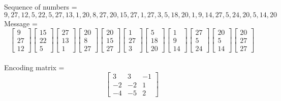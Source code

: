 \documentclass{article}
\begin{document}
\noindent
Sequence of numbers = 
$$
9, 27, 12, 5, 22, 5, 27, 13, 1, 20, 8, 27, 20, 15, 27, 1, 27, 3, 5, 18, 20, 1, 9, 14, 27, 5, 24, 20, 5, 14, 20
$$
{\center
Message = 
$$
\begin{bmatrix}
9\\
27\\
12
\end{bmatrix}
\begin{bmatrix}
15\\
22\\
5
\end{bmatrix}
\begin{bmatrix}
27\\
13\\
1
\end{bmatrix}
\begin{bmatrix}
20\\
8\\
27
\end{bmatrix}
\begin{bmatrix}
20\\
15\\
27
\end{bmatrix}
\begin{bmatrix}
1\\
27\\
3
\end{bmatrix}
\begin{bmatrix}
5\\
18\\
20
\end{bmatrix}
\begin{bmatrix}
1\\
9\\
14
\end{bmatrix}
\begin{bmatrix}
27\\
5\\
24
\end{bmatrix}
\begin{bmatrix}
20\\
5\\
14
\end{bmatrix}
\begin{bmatrix}
20\\
27\\
27
\end{bmatrix}
$$ \\

Encoding matrix = 
$$
\begin{bmatrix}
3 & 3 & -1\\
-2 & -2 & 1\\
-4 & -5 & 2
\end{bmatrix}
$$
\endcenter}
\end{document}
